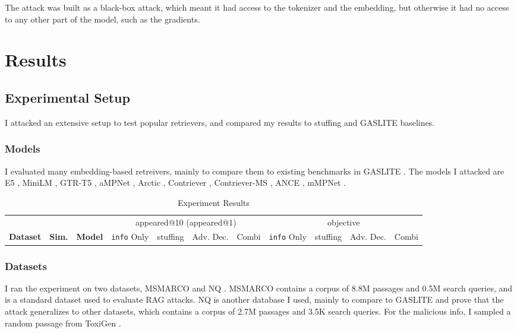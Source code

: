 \documentclass[a4paper, sigconf]{acmart}
\begin{document}
The attack was built as a black-box attack, which meant it had access to the tokenizer and the embedding, but otherwise it had no access to any other part of the model, such as the gradients.


\section{Results}

\subsection{Experimental Setup} \label{sec:expset}

I attacked an extensive setup to test popular retrievers, and compared my results to stuffing and GASLITE baselines.

\subsubsection*{Models} I evaluated many embedding-based retreivers, mainly to compare them to existing benchmarks in GASLITE \cite{bentov2024}. The models I attacked are E5 \cite{wang2024}, MiniLM \cite{wang2020}, GTR-T5 \cite{ni2021}, aMPNet \cite{song2020}, Arctic \cite{merrick2024}, Contriever \cite{izacard2022}, Contriever-MS \cite{izacard2022}, ANCE \cite{xiong2020}, mMPNet \cite{song2020}.

\begin{table}[h!]
\caption{Experiment Results}
\label{table:res}
\begin{tabular}{lll|cccc|cccc}
  \hline
   & & & \multicolumn{4}{c}{appeared@10 (appeared@1)} & \multicolumn{4}{c}{objective} \\
  \textbf{Dataset} & \textbf{Sim.} & \textbf{Model} & \texttt{info} Only & stuffing & Adv. Dec. & Combi & \texttt{info} Only & stuffing & Adv. Dec. & Combi \\
  \hline
 
 \end{tabular}
\end{table}

\subsubsection*{Datasets} I ran the experiment on two datasets, MSMARCO \cite{bajaj2018} and NQ \cite{kwiatkowski2019}. MSMARCO contains a corpus of 8.8M passages and 0.5M search queries, and is a standard dataset used to evaluate RAG attacks. NQ is another database I used, mainly to compare to GASLITE \cite{bentov2024} and prove that the attack generalizes to other datasets, which contains a corpus of 2.7M passages and 3.5K search queries. For the malicious info, I sampled a random passage from ToxiGen \cite{hartvigsen2022}.
\end{document}
